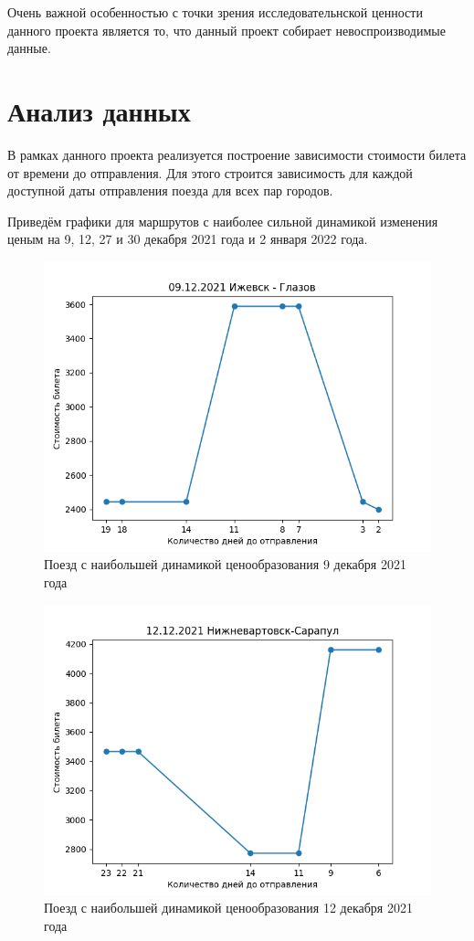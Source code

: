 \documentclass[conference]{IEEEtran}
\begin{document}
Очень важной особенностью с точки зрения исследовательнской ценности данного проекта является то, что данный проект собирает невоспроизводимые данные.

\section{Анализ данных}

В рамках данного проекта реализуется построение зависимости стоимости билета от времени до отправления. Для этого строится зависимость для каждой доступной даты отправления поезда для всех пар городов.

Приведём графики для маршрутов с наиболее сильной динамикой изменения ценым на 9, 12, 27 и 30 декабря 2021 года и 2 января 2022 года.

\begin{figure}
	\includegraphics[scale=0.5]{09122021}
	\caption{Поезд с наибольшей динамикой ценообразования 9 декабря 2021 года}
\end{figure}

\begin{figure}
	\includegraphics[scale=0.5]{12122021}
	\caption{Поезд с наибольшей динамикой ценообразования 12 декабря 2021 года}
\end{figure}
\end{document}
